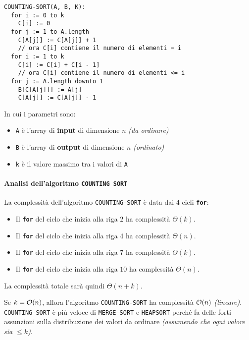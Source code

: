 \documentclass[italian, 10pt]{article}
\begin{document}
\begin{lstlisting}[float, style=pseudocode, caption={Pseudocodice algorimo \texttt{COUNTING-SORT}}, label={lst:counting-sort}]
COUNTING-SORT(A, B, K):
  for i := 0 to k
    C[i] := 0
  for j := 1 to A.length
    C[A[j]] := C[A[j]] + 1
    // ora C[i] contiene il numero di elementi = i
  for i := 1 to k
    C[i] := C[i] + C[i - 1]
    // ora C[i] contiene il numero di elementi <= i
  for j := A.length downto 1
    B[C[A[j]]] := A[j]
    C[A[j]] := C[A[j]] - 1
\end{lstlisting}

In cui i parametri sono:

\begin{itemize}
  \item \texttt{A} è l'array di \textbf{input} di dimensione \(n\) \textit{(da ordinare)}
  \item \texttt{B} è l'array di \textbf{output} di dimensione \(n\) \textit{(ordinato)}
  \item \texttt{k} è il valore massimo tra i valori di \texttt{A}
\end{itemize}

\paragraph{Analisi dell'algoritmo \texttt{COUNTING SORT}}

La complessità dell'algoritmo \texttt{COUNTING-SORT} è data dai \(4\) cicli \textbf{\texttt{for}}:

\begin{itemize}
  \item Il \textbf{\texttt{for}} del ciclo che inizia alla riga \(2\) ha complessità \(\Theta(k)\).
  \item Il \textbf{\texttt{for}} del ciclo che inizia alla riga \(4\) ha complessità \(\Theta(n)\).
  \item Il \textbf{\texttt{for}} del ciclo che inizia alla riga \(7\) ha complessità \(\Theta(k)\).
  \item Il \textbf{\texttt{for}} del ciclo che inizia alla riga \(10\) ha complessità \(\Theta(n)\).
\end{itemize}

La complessità totale sarà quindi \(\Theta(n+k)\).

Se \(k = \mathcal{O}(n)\), allora l'algoritmo \texttt{COUNTING-SORT} ha complessità \(\mathcal{O}(n)\) \textit{(lineare)}.
\texttt{COUNTING-SORT} è più veloce di \texttt{MERGE-SORT} e \texttt{HEAPSORT} perché fa delle forti assunzioni sulla distribuzione dei valori da ordinare \textit{(assumendo che ogni valore sia \(\leq k\))}.
\end{document}
